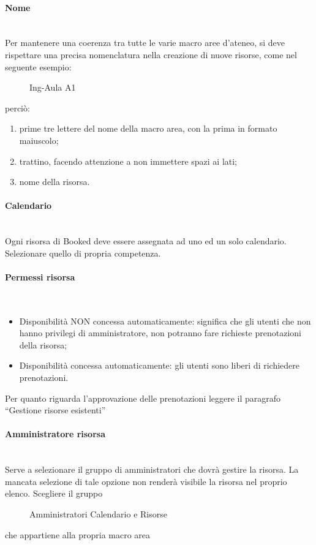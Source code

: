 \paragraph*{Nome}\mbox{}\\ %
Per mantenere una coerenza tra tutte le varie macro aree d'ateneo, si deve rispettare una precisa
nomenclatura nella creazione di nuove risorse, come nel seguente esempio:
\begin{figure}[H]
\centering{}Ing-Aula A1
\normalsize
\end{figure}
perciò:
\begin{enumerate}
 \item prime tre lettere del nome della macro area, con la prima in formato maiuscolo;
 \item trattino, facendo attenzione a non immettere spazi ai lati;
 \item nome della risorsa.
\end{enumerate}

\paragraph*{Calendario}\mbox{}\\ %
Ogni risorsa di Booked deve essere assegnata ad uno ed un solo calendario.
Selezionare quello di propria competenza.

\paragraph*{Permessi risorsa}\mbox{}\\ %
\begin{itemize}
 \item Disponibilità NON concessa automaticamente: significa che gli utenti che non hanno privilegi
 di amministratore, non potranno fare richieste prenotazioni della risorsa;
 \item Disponibilità concessa automaticamente: gli utenti sono liberi di richiedere prenotazioni.
\end{itemize}
Per quanto riguarda l'approvazione delle prenotazioni leggere il paragrafo
``Gestione risorse esistenti''

\paragraph*{Amministratore risorsa}\mbox{}\\ %
Serve a selezionare il gruppo di amministratori che dovrà gestire la risorsa. La mancata selezione
di tale opzione non renderà visibile la risorsa nel proprio elenco.
Scegliere il gruppo
\begin{figure}[H]
\centering{}Amministratori Calendario e Risorse
\normalsize
\end{figure}
che appartiene alla propria macro area


